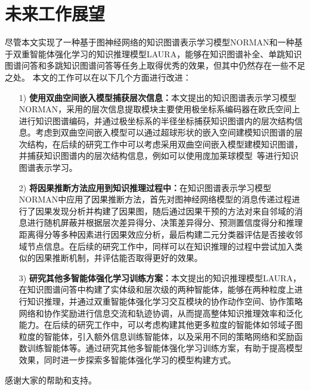 \documentclass[algorithmlist, AutoFakeBold, AutoFakeSlant, figurelist, tablelist, nomlist, engineering]{seuthesix}
\begin{document}
\section{未来工作展望}
尽管本文实现了一种基于图神经网络的知识图谱表示学习模型NORMAN和一种基于双重智能体强化学习的知识推理模型LAURA，能够在知识图谱补全、单跳知识图谱问答和多跳知识图谱问答等任务上取得优秀的效果，但其中仍然存在一些不足之处。
本文的工作可以在以下几个方面进行改进：
\begin{itemize}
  \item [1)]\textbf{使用双曲空间嵌入模型捕获层次信息：}本文提出的知识图谱表示学习模型NORMAN，采用的层次信息提取模块主要使用极坐标系编码器在欧氏空间上进行知识图谱编码，并通过极坐标系的半径坐标捕获知识图谱内的层次结构信息。考虑到双曲空间嵌入模型可以通过超球形状的嵌入空间建模知识图谱的层次结构，在后续的研究工作中可以考虑采用双曲空间嵌入模型建模知识图谱，并捕获知识图谱内的层次结构信息，例如可以使用庞加莱球模型~\cite{abramowicz2002poincare}等进行知识图谱表示学习。
  \item [2)]\textbf{将因果推断方法应用到知识推理过程中：}在知识图谱表示学习模型NORMAN中应用了因果推断方法，首先对图神经网络模型的消息传递过程进行了因果发现分析并构建了因果图，随后通过因果干预的方法对来自邻域的消息进行随机屏蔽并根据层次差异得分、决策差异得分、预测置信度得分和推理距离得分等多种因素进行因果效应分析，最后构建二元分类器评估是否接收邻域节点信息。在后续的研究工作中，同样可以在知识推理的过程中尝试加入类似的因果推断机制，并评估能否取得更好的效果。
  \item [3)]\textbf{研究其他多智能体强化学习训练方案：}本文提出的知识推理模型LAURA，在知识图谱问答中构建了实体级和层次级的两种智能体，能够在两种粒度上进行知识推理，并通过双重智能体强化学习交互模块的协作动作空间、协作策略网络和协作奖励进行信息交流和轨迹协调，从而提高整体知识推理效率和泛化能力。在后续的研究工作中，可以考虑构建其他更多粒度的智能体如邻域子图粒度的智能体，引入额外信息训练智能体，以及采用不同的策略网络和奖励函数训练智能体等。通过研究其他多智能体强化学习训练方案，有助于提高模型效果，同时进一步探索多智能体强化学习的模型构建方式。
\end{itemize}

\acknowledgement
感谢大家的帮助和支持。


% 
% 
% 
\end{document}
